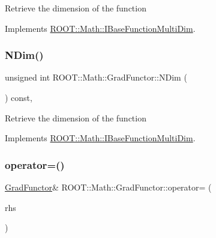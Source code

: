 Retrieve the dimension of the function 

Implements \mbox{\hyperlink{classROOT_1_1Math_1_1IBaseFunctionMultiDim_a16f37dc7a6d00c75ddeda0697741315d}{R\+O\+O\+T\+::\+Math\+::\+I\+Base\+Function\+Multi\+Dim}}.

\mbox{\label{classROOT_1_1Math_1_1GradFunctor_a7ff4ed4ad6f7c17d74403a443990f069}} 
\subsubsection{\texorpdfstring{NDim()}{NDim()}\hspace{0.1cm}{\footnotesize\ttfamily [3/3]}}
{\footnotesize\ttfamily unsigned int R\+O\+O\+T\+::\+Math\+::\+Grad\+Functor\+::\+N\+Dim (\begin{DoxyParamCaption}{ }\end{DoxyParamCaption}) const\hspace{0.3cm}{\ttfamily [inline]}, {\ttfamily [virtual]}}

Retrieve the dimension of the function 

Implements \mbox{\hyperlink{classROOT_1_1Math_1_1IBaseFunctionMultiDim_a16f37dc7a6d00c75ddeda0697741315d}{R\+O\+O\+T\+::\+Math\+::\+I\+Base\+Function\+Multi\+Dim}}.

\mbox{\label{classROOT_1_1Math_1_1GradFunctor_a7f7a0c6b466d283cb6085f0e57ab1e6a}} 
\subsubsection{\texorpdfstring{operator=()}{operator=()}\hspace{0.1cm}{\footnotesize\ttfamily [1/3]}}
{\footnotesize\ttfamily \mbox{\hyperlink{classROOT_1_1Math_1_1GradFunctor}{Grad\+Functor}}\& R\+O\+O\+T\+::\+Math\+::\+Grad\+Functor\+::operator= (\begin{DoxyParamCaption}\item[{const \mbox{\hyperlink{classROOT_1_1Math_1_1GradFunctor}{Grad\+Functor}} \&}]{rhs }\end{DoxyParamCaption})\hspace{0.3cm}{\ttfamily [inline]}}

